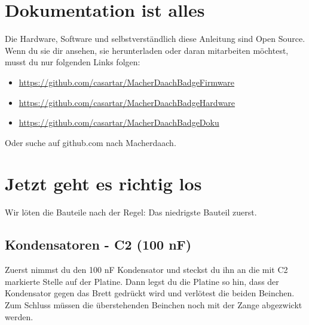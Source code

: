 \documentclass{article}
\begin{document}
\section{Dokumentation ist alles}

Die Hardware, Software und selbstverständlich diese Anleitung sind Open Source. Wenn du sie dir ansehen, sie herunterladen oder daran mitarbeiten möchtest, musst du nur folgenden Links folgen:

\begin{itemize}
	\item \url{https://github.com/casartar/MacherDaachBadgeFirmware}
	\item \url{https://github.com/casartar/MacherDaachBadgeHardware}
	\item \url{https://github.com/casartar/MacherDaachBadgeDoku}
\end{itemize}

Oder suche auf github.com nach Macherdaach.

\section{Jetzt geht es richtig los}
Wir löten die Bauteile nach der Regel: Das niedrigste Bauteil zuerst.

\subsection{Kondensatoren - C2 (100 nF)}

Zuerst nimmst du den 100 nF Kondensator und steckst du ihn an die mit C2 markierte Stelle auf der Platine.
Dann legst du die Platine so hin, dass der Kondensator gegen das Brett gedrückt wird und verlötest die beiden Beinchen.
Zum Schluss müssen die überstehenden Beinchen noch mit der Zange abgezwickt werden.

\vspace{1cm}
\end{document}

